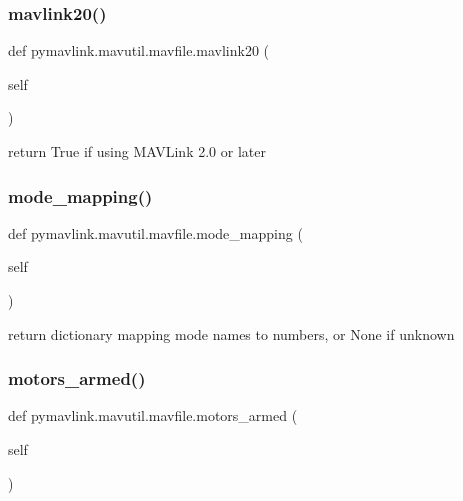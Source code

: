 \subsubsection{\texorpdfstring{mavlink20()}{mavlink20()}}
{\footnotesize\ttfamily def pymavlink.\+mavutil.\+mavfile.\+mavlink20 (\begin{DoxyParamCaption}\item[{}]{self }\end{DoxyParamCaption})}

\begin{DoxyVerb}return True if using MAVLink 2.0 or later\end{DoxyVerb}
 \mbox{\label{classpymavlink_1_1mavutil_1_1mavfile_a243064da4dc092d07af642404240613b}} 
\subsubsection{\texorpdfstring{mode\+\_\+mapping()}{mode\_mapping()}}
{\footnotesize\ttfamily def pymavlink.\+mavutil.\+mavfile.\+mode\+\_\+mapping (\begin{DoxyParamCaption}\item[{}]{self }\end{DoxyParamCaption})}

\begin{DoxyVerb}return dictionary mapping mode names to numbers, or None if unknown\end{DoxyVerb}
 \mbox{\label{classpymavlink_1_1mavutil_1_1mavfile_a335d09b6fa521448d97ea2597d0387c0}} 
\subsubsection{\texorpdfstring{motors\+\_\+armed()}{motors\_armed()}}
{\footnotesize\ttfamily def pymavlink.\+mavutil.\+mavfile.\+motors\+\_\+armed (\begin{DoxyParamCaption}\item[{}]{self }\end{DoxyParamCaption})}


